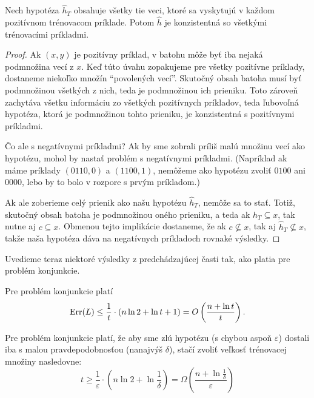 \begin{theorem}
  Nech hypotéza $\hat{h}_T$ obsahuje všetky tie veci, ktoré sa vyskytujú
  v každom pozitívnom trénovacom príklade. Potom $\hat{h}$ je
  konzistentná so všetkými trénovacími príkladmi.
\end{theorem}
\begin{proof}
  Ak $(x, y)$ je pozitívny príklad, v batohu môže byť iba nejaká podmnožina
  vecí z $x$. Keď túto úvahu zopakujeme pre všetky pozitívne príklady,
  dostaneme niekoľko množín ``povolených vecí''. Skutočný obsah batoha
  musí byť podmnožinou všetkých z nich, teda je podmnožinou ich prieniku.
  Toto zároveň zachytáva všetku informáciu zo všetkých pozitívnych príkladov,
  teda ľubovoľná hypotéza, ktorá je podmnožinou tohto prieniku,
  je konzistentná s pozitívnymi príkladmi.
  
  Čo ale s negatívnymi príkladmi? Ak by sme zobrali príliš malú
  množinu vecí ako hypotézu, mohol by nastať problém s negatívnymi
  príkladmi. (Napríklad ak máme príklady $(0110, 0)$ a $(1100, 1)$,
  nemôžeme ako hypotézu zvoliť $0100$ ani $0000$, lebo by to bolo
  v rozpore s prvým príkladom.)
  
  Ak ale zoberieme celý prienik ako našu hypotézu $\hat{h}_T$, nemôže
  sa to stať. Totiž, skutočný obsah batoha je podmnožinou oného
  prieniku, a teda ak $\hat{h}_T \subseteq x$, tak nutne aj
  $c \subseteq x$. Obmenou tejto implikácie dostaneme, že ak
  $c \not\subseteq x$, tak aj $\hat{h}_T \not\subseteq x$, takže
  naša hypotéza dáva na negatívnych príkladoch rovnaké výsledky.
\end{proof}

Uvedieme teraz niektoré výsledky z predchádzajúcej časti tak, ako platia
pre problém konjunkcie.

\begin{theorem}
  Pre problém konjunkcie platí
  $$ \mathrm{Err}(L) \leq \frac{1}{t} \cdot \left( n \ln{2} + \ln{t} + 1 \right) = O\left( \frac{n + \ln{t}}{t} \right). $$
\end{theorem}
\begin{theorem} \label{cor:mconj_de}
  Pre problém konjunkcie platí, že aby sme zlú hypotézu (s chybou aspoň
  $\varepsilon$) dostali iba s malou pravdepodobnosťou (nanajvýš $\delta$),
  stačí zvoliť veľkosť trénovacej množiny nasledovne:
  $$ t \geq \frac{1}{\varepsilon} \cdot \left( n \ln{2} + \ln{\frac{1}{\delta}} \right) = \Omega\left( \frac{n + \ln{\frac{1}{\delta}}}{\varepsilon} \right) $$
\end{theorem}

